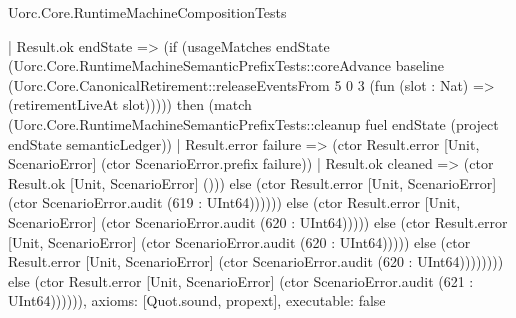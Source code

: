 \begin{lexlean}{Uorc.Core.RuntimeMachineCompositionTests}
\begin{semanticmodule}
{                    | Result.ok endState => (if (usageMatches endState (Uorc.Core.RuntimeMachineSemanticPrefixTests::coreAdvance baseline (Uorc.Core.CanonicalRetirement::releaseEventsFrom 5 0 3 (fun (slot : Nat) => (retirementLiveAt slot))))) then (match (Uorc.Core.RuntimeMachineSemanticPrefixTests::cleanup fuel endState (project endState semanticLedger))
                      | Result.error failure => (ctor Result.error [Unit, ScenarioError] (ctor ScenarioError.prefix failure))
                      | Result.ok cleaned => (ctor Result.ok [Unit, ScenarioError] ())) else (ctor Result.error [Unit, ScenarioError] (ctor ScenarioError.audit (619 : UInt64)))))) else (ctor Result.error [Unit, ScenarioError] (ctor ScenarioError.audit (620 : UInt64))))) else (ctor Result.error [Unit, ScenarioError] (ctor ScenarioError.audit (620 : UInt64))))) else (ctor Result.error [Unit, ScenarioError] (ctor ScenarioError.audit (620 : UInt64)))))))) else (ctor Result.error [Unit, ScenarioError] (ctor ScenarioError.audit (621 : UInt64)))))),
  axioms: [Quot.sound, propext],
  executable: false
}


\end{semanticmodule}
\end{lexlean}
